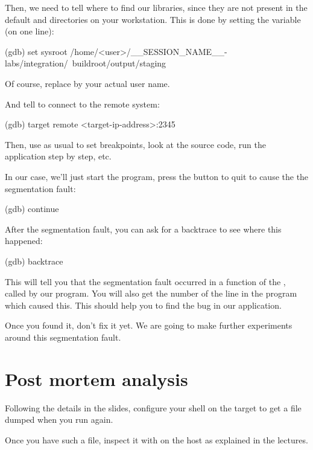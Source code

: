 Then, we need to tell where to find our libraries, since they are not
present in the default  and  directories on
your workstation. This is done by setting the  
variable (on one line):

\begin{bashinput}
(gdb) set sysroot /home/<user>/__SESSION_NAME__-labs/integration/\
    buildroot/output/staging
\end{bashinput}

Of course, replace  by your actual user name.

And tell  to connect to the remote system:
\begin{bashinput}
(gdb) target remote <target-ip-address>:2345
\end{bashinput}

Then, use  as usual to set breakpoints, look at the source
code, run the application step by step, etc.

In our case, we'll just start the program, press the  button
to quit to cause the the segmentation fault:
\begin{bashinput}
(gdb) continue
\end{bashinput}

After the segmentation fault, you can ask for a backtrace to see
where this happened:
\begin{bashinput}
(gdb) backtrace
\end{bashinput}

This will tell you that the segmentation fault occurred in a function
of the \code{libmpdclient}, called by our program. You will also get
the number of the line in the program which caused this. This should
help you to find the bug in our application.

Once you found it, don't fix it yet. We are going to make further
experiments around this segmentation fault.

\section{Post mortem analysis}

Following the details in the slides, configure your shell on the
target to get a \code{core.xxx} file dumped when you run
 again.

Once you have such a file, inspect it with 
on the host as explained in the lectures.

